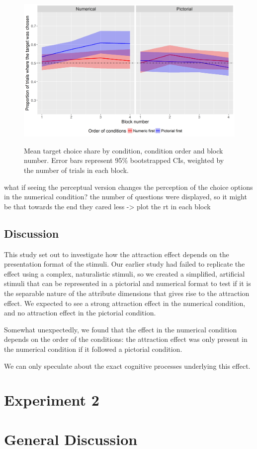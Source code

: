 \documentclass[11pt,a4paper]{article}
\begin{document}
\begin{figure}
\centering
\caption{Mean target choice share by condition, condition order and block number. Error bars represent 95\% bootstrapped CIs, weighted by the number of trials in each block.}
\includegraphics[width=1\textwidth]{Block_order.png}
\label{fig:Block_order}
\end{figure}


what if seeing the perceptual version changes the perception of the choice options in the numerical condition? the number of questions were displayed, so it might be that towards the end they cared less -> plot the rt in each block

\subsection{Discussion}

This study set out to investigate how the attraction effect depends on the presentation format of the stimuli. Our earlier study had failed to replicate the effect using a complex, naturalistic stimuli, so we created a simplified, artificial stimuli that can be represented in a pictorial and numerical format to test if it is the separable nature of the attribute dimensions that gives rise to the attraction effect.  We expected to see a strong attraction effect in the numerical condition, and no attraction effect in the pictorial condition.

Somewhat unexpectedly, we found that the effect in the numerical condition depends on the order of the conditions: the attraction effect was only present in the numerical condition if it followed a pictorial condition. 

We can only speculate about the exact cognitive processes underlying this effect.



\section{Experiment 2} 




\section{General Discussion} 










\newpage


\end{document}
